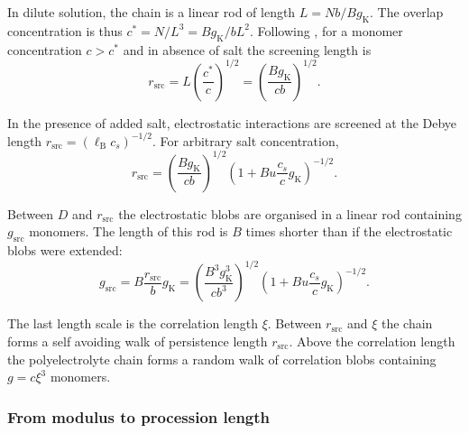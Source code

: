 \documentclass[journal=jacsat,manuscript=article]{achemso}
\begin{document}
In dilute solution, the chain is a linear rod of length $L= N b / B g_\mathrm{K}$. The overlap concentration is thus $c^* = N/L^3 = B g_\mathrm{K} / b L^2$. Following \cite{Dobrynin1995}, for a monomer concentration $c > c^*$ and in absence of salt the screening length is
\begin{equation}
r_\mathrm{src} = L \left(\frac{c^*}{c}\right)^{1/2} =  \left(\frac{B g_\mathrm{K}}{cb}\right)^{1/2}.
\label{eq:rscrNoSalt}
\end{equation}

In the presence of added salt, electrostatic interactions are screened at the Debye length $r_\mathrm{src} = \left(\ell_\mathrm{B} c_s\right)^{-1/2}$. For arbitrary salt concentration,
\begin{equation}
r_\mathrm{src} = \left(\frac{B g_\mathrm{K}}{cb}\right)^{1/2} \left(1+ B u \frac{c_s}{c} g_\mathrm{K}\right)^{-1/2}.
\label{eq:rscr}
\end{equation}

Between $D$ and $r_\mathrm{src}$ the electrostatic blobs are organised in a linear rod containing $g_\mathrm{src}$ monomers. The length of this rod is $B$ times shorter than if the electrostatic blobs were extended:
\begin{equation}
g_\mathrm{src} = B \frac{r_\mathrm{src}}{b} g_\mathrm{K} = \left(\frac{B^3 g_\mathrm{K}^3}{cb^3}\right)^{1/2} \left(1 + B u \frac{c_s}{c} g_\mathrm{K}\right)^{-1/2}.
\label{eq:gscr}
\end{equation}

The last length scale is the correlation length $\xi$. Between $r_\mathrm{src}$ and $\xi$ the chain forms a self avoiding walk of persistence length $r_\mathrm{src}$. Above the correlation length the polyelectrolyte chain forms a random walk of correlation blobs containing $g=c\xi^3$ monomers.


\subsubsection{From modulus to procession length}
\end{document}
